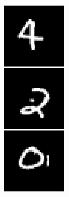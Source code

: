 \begin{figure}
    \centering
    \begin{subfigure}[c]{.045\linewidth}
        \includegraphics[width=\linewidth]{figures/SCA/mnist/inputs}

\end{subfigure}
\end{figure}
